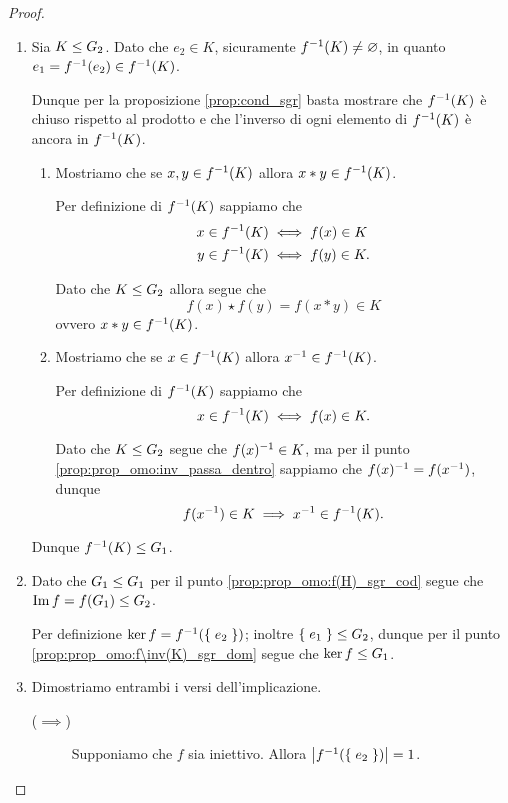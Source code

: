 \begin{proof}
\begin{enumerate}[label={(\roman*)}]
\begin{enumerate}[label={(\arabic*)}]
            Dunque $f(h\inv) \in f(H)$, ma per il punto \ref{prop:prop_omo:inv_passa_dentro} sappiamo che \[
                f(h\inv) = f(h)\inv = x\inv \in f(H).   
            \]
        \end{enumerate}
        Dunque $f(H) \sgr G_2$.
        \item Sia $K \sgr G_2$. Dato che $e_2 \in K$, sicuramente $f\inv(K) \neq \varnothing$, in quanto $e_1 = f\inv(e_2) \in f\inv(K)$.
        
        Dunque per la proposizione \ref{prop:cond_sgr} basta mostrare che $f\inv(K)$ è chiuso rispetto al prodotto e che l'inverso di ogni elemento di $f\inv(K)$ è ancora in $f\inv(K)$.

        \begin{enumerate}[label={(\arabic*)}]
            \item Mostriamo che se $x, y \in f\inv(K)$ allora $x* y \in f\inv(K)$.
            
            Per definizione di $f\inv(K)$ sappiamo che \begin{align*}
                x \in f\inv(K) &\iff f(x) \in K \\
                y \in f\inv(K) &\iff f(y) \in K.
            \end{align*}
            
            Dato che $K \sgr G_2$ allora segue che \[
                f(x) \star f(y) = f(x * y) \in K     
            \] ovvero $x * y \in f\inv(K)$.
            \item Mostriamo che se $x \in f\inv(K)$ allora $x\inv \in f\inv(K)$.
            
            Per definizione di $f\inv(K)$ sappiamo che \[
                x \in f\inv(K) \iff f(x) \in K.    
            \] 
            
            Dato che $K \sgr G_2$ segue che $f(x)\inv \in K$, ma per il punto \ref{prop:prop_omo:inv_passa_dentro} sappiamo che $f(x)\inv = f(x\inv)$, dunque \[
                f(x\inv) \in K \implies x\inv \in f\inv(K).  
            \]
        \end{enumerate}
        Dunque $f\inv(K) \sgr G_1$.
        \item Dato che $G_1 \sgr G_1$ per il punto \ref{prop:prop_omo:f(H)_sgr_cod} segue che $\Imm f = f(G_1) \sgr G_2$.
        
        Per definizione $\ker f = f\inv(\set{e_2})$; inoltre $\set{e_1} \sgr G_2$, dunque per il punto \ref{prop:prop_omo:f\inv(K)_sgr_dom} segue che $\ker f \sgr G_1$.
        \item Dimostriamo entrambi i versi dell'implicazione.
        \begin{description}
            \item[($\implies$)] Supponiamo che $f$ sia iniettivo. Allora $\abs*{f\inv(\set{e_2})} = 1$.
            

\end{description}
\end{enumerate}
\end{proof}

